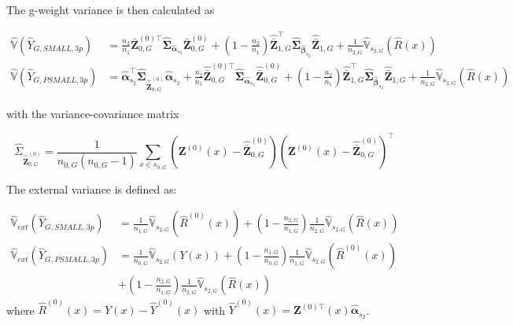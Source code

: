 \documentclass[article]{jss}
\newcommand{\var}{\mathbb{V}}
\begin{document}
The g-weight variance is then calculated as

\begin{subequations}\label{eq:var_3p_small_psmall}
\begin{align}
\hat{\var}(\hat{Y}_{G,SMALL,3p})& =\frac{n_2}{n_1}\bar{\pmb{Z}}^{(0)\top}_{0,G}\hat{\pmb{\Sigma}}_{\hat{\pmb{\alpha}}_{s_2}}
\bar{\pmb{Z}}^{(0)}_{0,G}+(1-\frac{n_2}{n_1})\hat{\bar{\pmb{Z}}}_{1,G}^{\top}\hat{\pmb{\Sigma}}_{\hat{\pmb{\beta}}_{s_2}}
\hat{\bar{\pmb{Z}}}_{1,G} +
\frac{1}{n_{2,G}}\hat{\var}_{s_{2,G}}(\hat{R}(x)) \label{eq:var_3p_reg_small}&\\
\hat{\var}(\hat{Y}_{G,PSMALL,3p})& = \hat{\pmb{\alpha}}_{s_2}^{\top}\hat{\pmb{\Sigma}}_{\hat{\bar{\pmb{Z}}}^{(0)}_{0,G}}\hat{\pmb{\alpha}}_{s_2} +
\frac{n_2}{n_1}\hat{\bar{\pmb{Z}}}^{(0)\top}_{0,G}\hat{\pmb{\Sigma}}_{\hat{\pmb{\alpha}}_{s_2}}
\hat{\bar{\pmb{Z}}}^{(0)}_{0,G}+(1-\frac{n_2}{n_1})\hat{\bar{\pmb{Z}}}_{1,G}^{\top}\hat{\pmb{\Sigma}}_{\hat{\pmb{\beta}}_{s_2}}
\hat{\bar{\pmb{Z}}}_{1,G} + \frac{1}{n_{2,G}}\hat{\var}_{s_{2,G}}(\hat{R}(x)) \label{eq:var_3p_reg_psmall}
\end{align}
\end{subequations}

with the variance-covariance matrix

\begin{equation}\label{estvarcovaux3pG}
\hat{\Sigma}_{\hat{\bar{\pmb{Z}}}^{(0)}_{0,G}}=
\frac{1}{n_{0,G}(n_{0,G}-1)}\sum_{x\in{s_{0,G}}}
(\pmb{Z}^{(0)}(x)-\hat{\bar{\pmb{Z}}}^{(0)}_{0,G})(\pmb{Z}^{(0)}(x)-\hat{\bar{\pmb{Z}}}^{(0)}_{0,G})^{\top}
\end{equation}

The external variance is defined as:

\begin{subequations}\label{eq:pest_3p_small_psmall}
\begin{flalign}
\hat{\var}_{ext}(\hat{Y}_{G,SMALL,3p})&= \frac{1}{n_{1,G}}\hat{\var}_{s_{2,G}}(\hat{R}^{(0)}(x)) +
 (1-\frac{n_{2,G}}{n_{1,G}})\frac{1}{n_{2,G}}\hat{\var}_{s_{2,G}}(\hat{R}(x)) \label{eq:var_3p_reg_small}&\\
\hat{\var}_{ext}(\hat{Y}_{G,PSMALL,3p})&= \frac{1}{n_{0,G}}\hat{\var}_{s_{2,G}}(Y(x)) + (1-\frac{n_{1,G}}{n_{0,G}}) \frac{1}{n_{1,G}}\hat{\var}_{s_{2,G}}(\hat{R}^{(0)}(x)) \nonumber &\\
 &+ (1-\frac{n_{2,G}}{n_{1,G}})\frac{1}{n_{2,G}}\hat{\var}_{s_{2,G}}(\hat{R}(x)) \label{eq:var_3p_reg_psmall}
\end{flalign}
\end{subequations}
where $\hat{R}^{(0)}(x)=Y(x)-\hat{Y}^{(0)}(x)$ with $\hat{Y}^{(0)}(x)=\pmb{Z}^{(0)\top}(x)\hat{\pmb{\alpha}}_{s_2}$.
\end{document}
